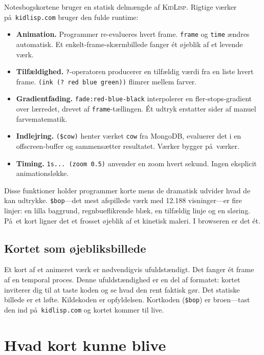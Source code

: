 \documentclass[10pt,letterpaper,twocolumn]{article}
\newcommand{\kidlisp}{\textsc{KidLisp}}
\begin{document}
Notesbogskortene bruger en statisk delm\ae ngde af \kidlisp{}. Rigtige v\ae rker p\aa\ \texttt{kidlisp.com} bruger den fulde runtime:

\begin{itemize}
  \item \textbf{Animation.} Programmer re-evalueres hvert frame. \texttt{frame} og \texttt{time} \ae ndres automatisk. Et enkelt-frame-sk\ae rmbillede fanger \'{e}t \o jeblik af et levende v\ae rk.
  \item \textbf{Tilf\ae ldighed.} \texttt{?}-operatoren producerer en tilf\ae ldig v\ae rdi fra en liste hvert frame. \texttt{(ink (? red blue green))} flimrer mellem farver.
  \item \textbf{Gradientfading.} \texttt{fade:red-blue-black} interpolerer en fler-stops-gradient over l\ae rredet, drevet af \texttt{frame}-t\ae llingen. \'{E}t udtryk erstatter sider af manuel farvematematik.
  \item \textbf{Indlejring.} \texttt{(\$cow)} henter v\ae rket \texttt{cow} fra MongoDB, evaluerer det i en offscreen-buffer og sammens\ae tter resultatet. V\ae rker bygger p\aa\ v\ae rker.
  \item \textbf{Timing.} \texttt{1s... (zoom 0.5)} anvender en zoom hvert sekund. Ingen eksplicit animationsl\o kke.
\end{itemize}

Disse funktioner holder programmer korte mens de dramatisk udvider hvad de kan udtrykke. \texttt{\$bop}---det mest afspillede v\ae rk med 12.188 visninger---er fire linjer: en lilla baggrund, regnbueflikrende bl\ae k, en tilf\ae ldig linje og en sl\o ring. P\aa\ et kort ligner det et frosset \o jeblik af et kinetisk maleri. I browseren er det \'{e}t.

\subsection{Kortet som \o jebliksbillede}

Et kort af et animeret v\ae rk er n\o dvendigvis ufuldst\ae ndigt. Det fanger \'{e}t frame af en temporal proces. Denne ufuldst\ae ndighed er en del af formatet: kortet inviterer dig til at taste koden og se hvad den rent faktisk g\o r. Det statiske billede er et l\o fte. Kildekoden er opfyldelsen. Kortkoden (\texttt{\$bop}) er broen---tast den ind p\aa\ \texttt{kidlisp.com} og kortet kommer til live.


\section{Hvad kort kunne blive}
\label{sec:futures}
\end{document}
